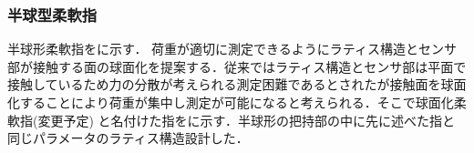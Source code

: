 \subsubsection{半球型柔軟指}
半球形柔軟指をに示す．
荷重が適切に測定できるようにラティス構造とセンサ部が接触する面の球面化を提案する．従来ではラティス構造とセンサ部は平面で接触しているため力の分散が考えられる測定困難であるとされたが接触面を球面化することにより荷重が集中し測定が可能になると考えられる．そこで球面化柔軟指(変更予定)	と名付けた指をに示す．半球形の把持部の中に先に述べた指と同じパラメータのラティス構造設計した．

\begin{figure}[h]
\centering
{}
\hspace{5mm}

\end{figure}

